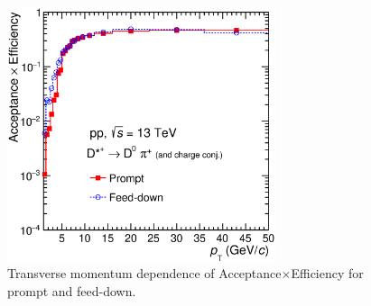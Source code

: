 \begin{figure}[tb]
\begin{center}
 \includegraphics[width=0.7\textwidth]{figures/Dstar/pp13TeV/DstarAccEffVsPt_pp_13TeV.eps}
\caption{Transverse momentum dependence of Acceptance$\times$Efficiency for prompt and feed-down.}
\label{fig:Dstar_eff}
\end{center}
\end{figure}

